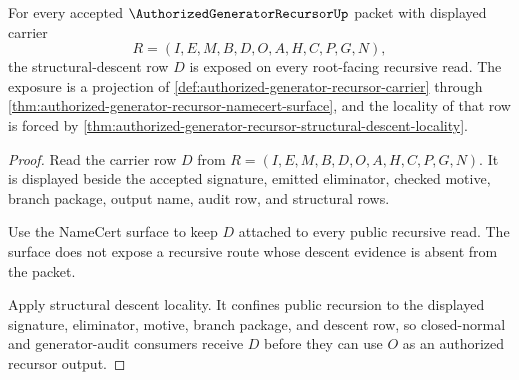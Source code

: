 \begin{theorem}
\label{thm:authorized-generator-recursor-root-descent-row-exposure}
For every accepted $\AuthorizedGeneratorRecursorUp$ packet with displayed carrier
$$
R=(I,E,M,B,D,O,A,H,C,P,G,N),
$$
the structural-descent row $D$ is exposed on every root-facing recursive read. The exposure is a projection of \autoref{def:authorized-generator-recursor-carrier} through \autoref{thm:authorized-generator-recursor-namecert-surface}, and the locality of that row is forced by \autoref{thm:authorized-generator-recursor-structural-descent-locality}.
\end{theorem}
\begin{proof}
Read the carrier row $D$ from $R=(I,E,M,B,D,O,A,H,C,P,G,N)$. It is displayed beside the accepted signature, emitted eliminator, checked motive, branch package, output name, audit row, and structural rows.

Use the NameCert surface to keep $D$ attached to every public recursive read. The surface does not expose a recursive route whose descent evidence is absent from the packet.

Apply structural descent locality. It confines public recursion to the displayed signature, eliminator, motive, branch package, and descent row, so closed-normal and generator-audit consumers receive $D$ before they can use $O$ as an authorized recursor output.
\end{proof}

